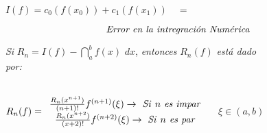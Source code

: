 \documentclass{article}
\begin{document}


$I(f)=c_{0}(f(x_{0}))+c_{1}(f(x_{1}))$\ \ $=$\ 



\[
\text{\emph{Error en la intregraci\'{o}n Num\'{e}rica}} 
\]

\textit{Si }$R_{n}=I(f)-\dint_{a}^{b}f(x)$ $dx$, \textit{entonces }$R_{n}(f)$
\textit{est\'{a} dado por:}\ \ \ \ \ \ \ \ \ \ \ \ \ \ \ \ \ \ \ \ \ \ \ \ 

\ \ \ \ \ \ \ \ \ \ \ \ \ \ \ \ \ \ \ \ \ \ \ \ \ \ \ \ \ \ \ \ \ \ \ \ \ \
\ $R_{n}(f)=%
\begin{array}{c}
\frac{R_{n}(x^{n+1})}{(n+1)!}f^{(n+1)}(\xi )\rightarrow \text{\textit{\ Si }}%
n\text{\textit{\ es impar}} \\ 
\frac{R_{n}(x^{n+2})}{(x+2)!}f^{(n+2)}(\xi )\rightarrow \text{ \textit{Si }}n%
\text{\textit{\ es par}}%
\end{array}%
$ $\ \ \ \ \xi \in \left( a,b\right) $


\end{document}
